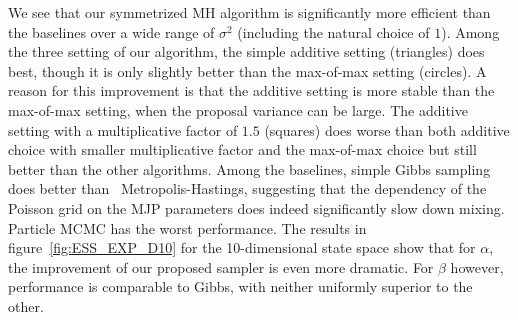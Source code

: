 We see that our symmetrized MH algorithm is significantly more efficient than the baselines over a wide range of $\sigma^2$ (including the natural choice of $1$).
Among the three setting of our algorithm, the simple additive setting
 ({triangles}) does best, though it is only slightly better than 
 the {max-of-max} setting (circles). 
A reason for this improvement is that the additive setting is more stable than the max-of-max setting, when the proposal variance can be large. 
The {additive setting with a multiplicative factor of $1.5$} (squares) does worse than both {additive choice with smaller multiplicative factor and the max-of-max choice} but still better than the other algorithms. 
Among the baselines, simple Gibbs sampling does better than \naive\ Metropolis-Hastings, suggesting that the dependency of the Poisson grid on the MJP parameters does indeed significantly slow down mixing. 
Particle MCMC has the worst performance. 
The results in figure~\ref{fig:ESS_EXP_D10} for the 10-dimensional state space show that for $\alpha$, the improvement of our proposed sampler is even more dramatic. 
   For $\beta$ however, performance is comparable to Gibbs, %
   with neither uniformly superior to the other.
